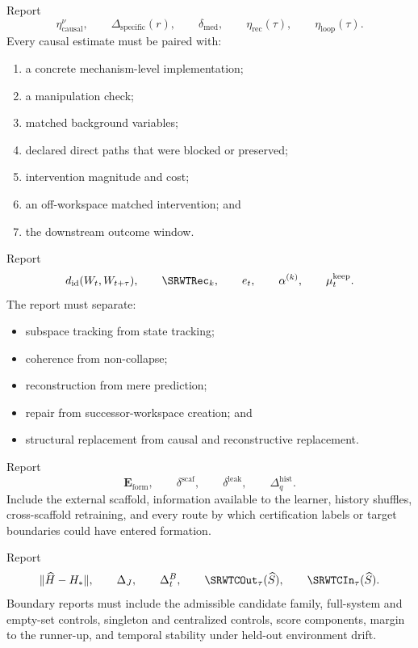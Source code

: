 Report
\[
\eta_{\mathrm{causal}}^\nu,
\qquad
\Delta_{\mathrm{specific}}(r),
\qquad
\delta_{\mathrm{med}},
\qquad
\eta_{\mathrm{rec}}(\tau),
\qquad
\eta_{\mathrm{loop}}(\tau).
\]
Every causal estimate must be paired with:
\begin{enumerate}
\item a concrete mechanism-level implementation;
\item a manipulation check;
\item matched background variables;
\item declared direct paths that were blocked or preserved;
\item intervention magnitude and cost;
\item an off-workspace matched intervention; and
\item the downstream outcome window.
\end{enumerate}


Report
\[
d_{\mathrm{id}}(W_t,W_{t+\tau}),
\qquad
\SRWTRec_k,
\qquad
 e_t,
\qquad
\alpha^{(k)},
\qquad
\mu_t^{\mathrm{keep}}.
\]
The report must separate:
\begin{itemize}
\item subspace tracking from state tracking;
\item coherence from non-collapse;
\item reconstruction from mere prediction;
\item repair from successor-workspace creation; and
\item structural replacement from causal and reconstructive replacement.
\end{itemize}


Report
\[
\mathbf E_{\mathrm{form}},
\qquad
\delta^{\mathrm{scaf}},
\qquad
\delta^{\mathrm{leak}},
\qquad
\Delta_q^{\mathrm{hist}}.
\]
Include the external scaffold, information available to the learner, history
shuffles, cross-scaffold retraining, and every route by which certification
labels or target boundaries could have entered formation.


Report
\[
\|\widehat H-H_*\|,
\qquad
\Delta_J,
\qquad
\Delta_t^B,
\qquad
\SRWTCOut_\tau(\widehat S),
\qquad
\SRWTCIn_\tau(\widehat S).
\]
Boundary reports must include the admissible candidate family, full-system and
empty-set controls, singleton and centralized controls, score components,
margin to the runner-up, and temporal stability under held-out environment
drift.

